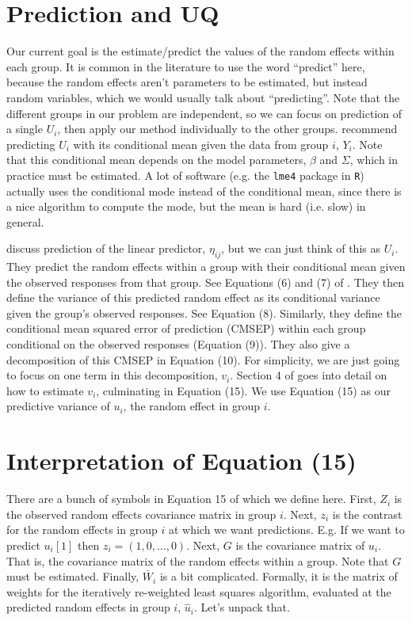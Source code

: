 \documentclass{article}
\begin{document}
\section{Prediction and UQ}

Our current goal is the estimate/predict the values of the random effects within each group. It is common in the literature to use the word ``predict'' here, because the random effects aren't parameters to be estimated, but instead random variables, which we would usually talk about ``predicting''. Note that the different groups in our problem are independent, so we can focus on prediction of a single $U_i$, then apply our method individually to the other groups. \citeauthor{Boo98} recommend predicting $U_i$ with its conditional mean given the data from group $i$, $Y_i$. Note that this conditional mean depends on the model parameters, $\beta$ and $\Sigma$, which in practice must be estimated. A lot of software (e.g. the \texttt{lme4} package in \texttt{R}) actually uses the conditional mode instead of the conditional mean, since there is a nice algorithm to compute the mode, but the mean is hard (i.e. slow) in general.

\citeauthor{Boo98} discuss prediction of the linear predictor, $\eta_{ij}$, but we can just think of this as $U_i$. They predict the random effects within a group with their conditional mean given the observed responses from that group. See Equations (6) and (7) of \citeauthor{Boo98}. They then define the variance of this predicted random effect as its conditional variance given the group's observed responses. See Equation (8). Similarly, they define the conditional mean squared error of prediction (CMSEP) within each group conditional on the observed responses (Equation (9)). They also give a decomposition of this CMSEP in Equation (10). For simplicity, we are just going to focus on one term in this decomposition, $v_i$. Section 4 of \citeauthor{Boo98} goes into detail on how to estimate $v_i$, culminating in Equation (15). We use Equation (15) as our predictive variance of $u_i$, the random effect in group $i$.

\section{Interpretation of Equation (15)}

There are a bunch of symbols in Equation 15 of \citeauthor{Boo98} which we define here. First, $Z_i$ is the observed random effects covariance matrix in group $i$. Next, $z_i$ is the contrast for the random effects in group $i$ at which we want predictions. E.g. If we want to predict $u_i[1]$ then $z_i = (1, 0, \ldots, 0)$. Next, $G$ is the covariance matrix of $u_i$. That is, the covariance matrix of the random effects within a group. Note that $G$ must be estimated. Finally, $\bar{W}_i$ is a bit complicated. Formally, it is the matrix of weights for the iteratively re-weighted least squares algorithm, evaluated at the predicted random effects in group $i$, $\hat{u}_i$. Let's unpack that.
\end{document}
